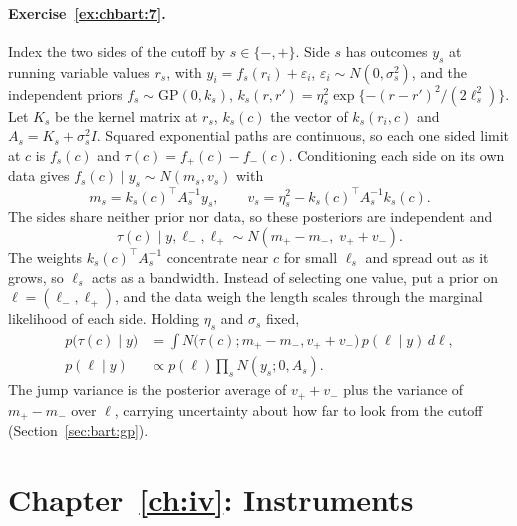\paragraph{Exercise~\ref{ex:chbart:7}.} Index the two sides of the cutoff by $s \in \{-, +\}$. Side $s$ has outcomes $y_s$ at running variable values $r_s$, with $y_i = f_s(r_i) + \varepsilon_i$, $\varepsilon_i \sim N(0, \sigma_s^2)$, and the independent priors $f_s \sim \mathrm{GP}(0, k_s)$, $k_s(r, r') = \eta_s^2\exp\{-(r - r')^2/(2\ell_s^2)\}$. Let $K_s$ be the kernel matrix at $r_s$, $k_s(c)$ the vector of $k_s(r_i, c)$ and $A_s = K_s + \sigma_s^2 I$. Squared exponential paths are continuous, so each one sided limit at $c$ is $f_s(c)$ and $\tau(c) = f_+(c) - f_-(c)$. Conditioning each side on its own data gives $f_s(c) \mid y_s \sim N(m_s, v_s)$ with
\[
m_s = k_s(c)^\top A_s^{-1}y_s, \qquad v_s = \eta_s^2 - k_s(c)^\top A_s^{-1}k_s(c).
\]
The sides share neither prior nor data, so these posteriors are independent and
\[
\tau(c) \mid y, \ell_-, \ell_+ \sim N(m_+ - m_-,\; v_+ + v_-).
\]
The weights $k_s(c)^\top A_s^{-1}$ concentrate near $c$ for small $\ell_s$ and spread out as it grows, so $\ell_s$ acts as a bandwidth. Instead of selecting one value, put a prior on $\ell = (\ell_-, \ell_+)$, and the data weigh the length scales through the marginal likelihood of each side. Holding $\eta_s$ and $\sigma_s$ fixed,
\begin{align*}
p\bigl(\tau(c) \mid y\bigr) &= \int N\bigl(\tau(c); m_+ - m_-, v_+ + v_-\bigr)\,p(\ell \mid y)\,d\ell, \\
p(\ell \mid y) &\propto p(\ell)\prod_s N(y_s; 0, A_s).
\end{align*}
The jump variance is the posterior average of $v_+ + v_-$ plus the variance of $m_+ - m_-$ over $\ell$, carrying uncertainty about how far to look from the cutoff (Section~\ref{sec:bart:gp}).


\section*{Chapter~\ref{ch:iv}: Instruments}

